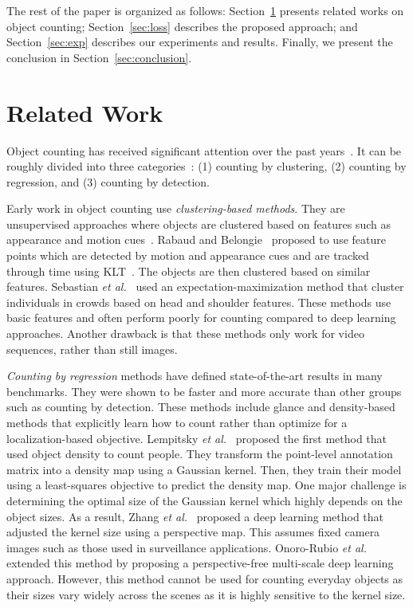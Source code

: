 \documentclass[runningheads]{llncs}
\begin{document}
The rest of the paper is organized as follows: Section~\ref{sec:related-works} presents related works on object counting; Section~\ref{sec:loss} describes the proposed approach; and Section~\ref{sec:exp} describes our experiments and results. Finally, we present the conclusion in Section~\ref{sec:conclusion}.

\section{Related Work}
\label{sec:related-works}

Object counting has received significant attention over the past years~\cite{rabaud2006counting,chattopadhyay2016counting,lempitsky2010learning}. It can be roughly divided into three categories~\cite{loy2013crowd}: (1) counting by clustering, (2) counting by regression, and (3) counting by detection.

Early work in object counting use {\it clustering-based methods}. They are unsupervised approaches where objects are clustered based on features such as appearance and motion cues~\cite{rabaud2006counting,tu2008unified}. Rabaud and Belongie~\cite{rabaud2006counting} proposed to use feature points which are detected by motion and appearance cues and are tracked through time using KLT~\cite{Shi1993}. The objects are then clustered based on similar features. Sebastian \emph{et al.}~\cite{tu2008unified} used an expectation-maximization method that cluster individuals in crowds based on head and shoulder features. These methods use basic features and often perform poorly for counting compared to deep learning approaches. Another drawback is that these methods only work for video sequences, rather than still images.

\textit{Counting by regression} methods have defined state-of-the-art results in many benchmarks. They were shown to be faster and more accurate than other groups such as counting by detection. These methods include glance and density-based methods that explicitly learn how to count rather than optimize for a localization-based objective. Lempitsky \emph{et al.}~\cite{lempitsky2010learning} proposed the first method that used object density to count people. They transform the point-level annotation matrix into a density map using a Gaussian kernel. Then, they train their model using a least-squares objective to predict the density map. One major challenge is determining the optimal size of the Gaussian kernel which highly depends on the object sizes. As a result, Zhang \emph{et al.}~\cite{zhang2016single} proposed a deep learning method that adjusted the kernel size using a perspective map. This assumes fixed camera images such as those used in surveillance applications. Onoro-Rubio \emph{et al.}~\cite{onoro2016towards}  extended this method by proposing a perspective-free multi-scale deep learning approach. However, this method cannot be used for counting everyday objects as their sizes vary widely across the scenes as it is highly sensitive to the kernel size.
\end{document}
